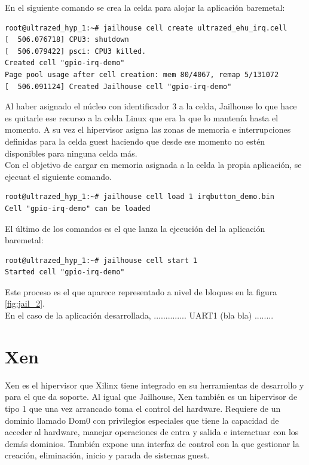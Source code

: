 En el siguiente comando se crea la celda para alojar la aplicación baremetal:

\begin{lstlisting}[style=CStyle]
root@ultrazed_hyp_1:~# jailhouse cell create ultrazed_ehu_irq.cell
[  506.076718] CPU3: shutdown
[  506.079422] psci: CPU3 killed.
Created cell "gpio-irq-demo"
Page pool usage after cell creation: mem 80/4067, remap 5/131072
[  506.091124] Created Jailhouse cell "gpio-irq-demo"
\end{lstlisting}

Al haber asignado el núcleo con identificador 3 a la celda, Jailhouse lo que hace es quitarle ese recurso a la celda Linux que era la que lo mantenía hasta el momento. A su vez el hipervisor asigna las zonas de memoria e interrupciones definidas para la celda guest haciendo que desde ese momento no estén disponibles para ninguna celda más.\\

Con el objetivo de cargar en memoria asignada a la celda la propia aplicación, se ejecuat el siguiente comando.
\begin{lstlisting}[style=CStyle]
root@ultrazed_hyp_1:~# jailhouse cell load 1 irqbutton_demo.bin
Cell "gpio-irq-demo" can be loaded
\end{lstlisting}

El último de los comandos es el que lanza la ejecución del la aplicación baremetal:
\begin{lstlisting}[style=CStyle]
root@ultrazed_hyp_1:~# jailhouse cell start 1
Started cell "gpio-irq-demo"
\end{lstlisting}

Este proceso es el que aparece representado a nivel de bloques en la figura \ref{fig:jail_2}.\\

En el caso de la aplicación desarrollada, .............. UART1 (bla bla) ........

\section{Xen}

Xen es el hipervisor que Xilinx tiene integrado en su herramientas de desarrollo y para el que da soporte. Al igual que Jailhouse, Xen también es un hipervisor de tipo 1 que una vez arrancado toma el control del hardware. Requiere de un dominio llamado Dom0 con privilegios especiales que tiene la capacidad de acceder al hardware, manejar operaciones de entra y salida e interactuar con los demás dominios. También expone una interfaz de control con la que gestionar la creación, eliminación, inicio y parada de sistemas guest.


